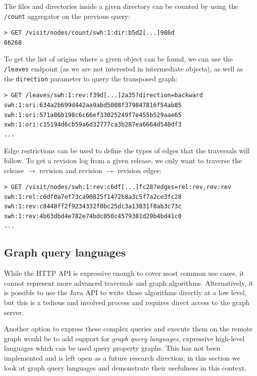 The files and directories inside a given directory can be counted by using the
\texttt{/count} aggregator on the previous query:

\begin{verbatim}
> GET /visit/nodes/count/swh:1:dir:b5d2[...]986d
66268
\end{verbatim}

To get the list of origins where a given object can be found, we can use
the \texttt{/leaves} endpoint (as we are not interested in intermediate
objects), as well as the \texttt{direction} parameter to query the transposed
graph:

\begin{verbatim}
> GET /leaves/swh:1:rev:f39d[...]2a35?direction=backward
swh:1:ori:634a2b699d442aa9abd5008f379847816f54ab85
swh:1:ori:571a86b198c6c66ef33025249f7e455b529aae65
swh:1:ori:c15194d6cb59a6d32777ca3b287ea6664d540df3
...
\end{verbatim}

Edge restrictions can be used to define the types of edges that the traversals
will follow. To get a revision log from a given release, we only want to traverse
the release $\to$ revision and revision $\to$ revision edges:

\begin{verbatim}
> GET /visit/nodes/swh:1:rev:c6df[...]fc28?edges=rel:rev,rev:rev
swh:1:rel:c6df0a7ef73ca90825f1472b8a3c5f7a2ce3fc28
swh:1:rev:c8448ff2f9234332f0bc25dc3a13031f8ab3c73c
swh:1:rev:4b63dbd4e782e74bdc050c4579381d29b4bd41c0
...
\end{verbatim}

\subsection{Graph query languages}

While the HTTP API is expressive enough to cover most common use cases, it
cannot represent more advanced traversals and graph algorithms. Alternatively,
it is possible to use the Java API to write those algorithms directly at a
low level, but this is a tedious and involved process and requires direct
access to the graph server.

Another option to express these complex queries and execute them on the remote
graph would be to add support for \emph{graph query languages}, expressive
high-level languages which can be used query property graphs. This has not been
implemented and is left open as a future research direction; in this section we
look at graph query languages and demonstrate their usefulness in this context.

